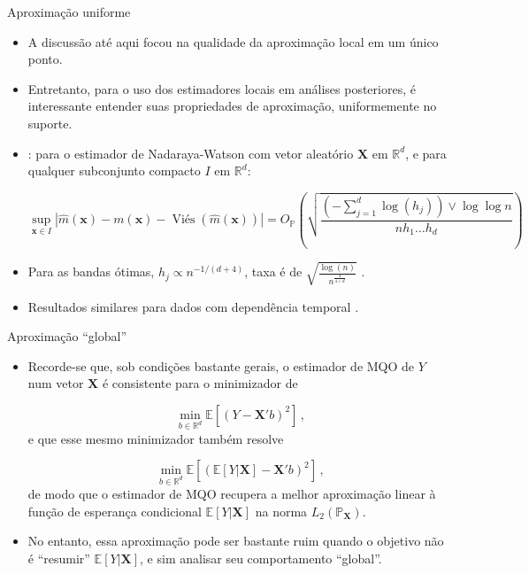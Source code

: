 \documentclass[11pt]{beamer}
\begin{document}
	\begin{frame}{Aproximação uniforme}
		\begin{itemize}
			\item A discussão até aqui focou na qualidade da aproximação local em um único ponto.
			\item Entretanto, para o uso dos estimadores locais em análises posteriores, é interessante entender suas propriedades de aproximação, {\color{blue}uniformemente no suporte}.
			\item \citet{Einmahl2005}: para o estimador de Nadaraya-Watson com vetor aleatório $\mathbf{X}$ em $\mathbb{R}^d$,  e para qualquer subconjunto compacto $I$ em $\mathbb{R}^d$:
			
			$$\sup_{\boldsymbol{x} \in I}|\hat{m}(\boldsymbol{x}) - m(\boldsymbol{x}) - \operatorname{Viés}(\hat{m}(\boldsymbol{x}))| = O_{\mathbb{P}}\left(\sqrt{\frac{ (-\sum_{j=1}^d \log(h_j)) \lor \log \log n}{{nh_1\ldots h_d}}}\right)$$ 
			\item Para as bandas ótimas, $ h_j  \propto n^{-1/(d+4)}$, taxa é de $\sqrt{\frac{\log(n)}{n^{\frac{4}{4+d}}}}$ .
			\item Resultados similares para dados com dependência temporal \citep{alvarez2023maximalinequalitylocalempirical}.
		\end{itemize}
	\end{frame}
	
	\begin{frame}{Aproximação ``global''}
		\begin{itemize}
			\item Recorde-se que, sob condições bastante gerais, o estimador de MQO de $Y$ num vetor $\boldsymbol{X}$ é consistente para o minimizador de
			
			$$\min_{b \in \mathbb{R}^d} \mathbb{E}[(Y-\boldsymbol{X}'b)^2]\,, $$
			e que esse mesmo minimizador também resolve
			
			$$\min_{b \in \mathbb{R}^d} \mathbb{E}[(\mathbb{E}[Y|\boldsymbol{X}]-\boldsymbol{X}'b)^2]\,, $$
			de modo que o estimador de MQO recupera a melhor aproximação linear à função de esperança condicional $\mathbb{E}[Y|\boldsymbol{X}]$ na norma $L_2(\mathbb{P}_{\boldsymbol{X}})$.
			\item No entanto, essa aproximação pode ser bastante ruim quando o objetivo não é ``resumir'' $\mathbb{E}[Y|\mathbf{X}]$, e sim analisar seu comportamento ``global''.
		\end{itemize}
	\end{frame}
	
\end{document}
